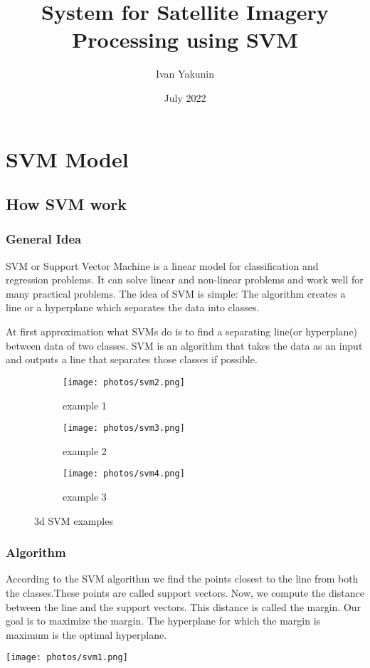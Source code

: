 \documentclass[10pt,a4paper]{report}
\title{System for Satellite Imagery Processing using SVM}
\author{Ivan Yakunin}
\date{July 2022}
\begin{document}
\maketitle
\tableofcontents
\part{SVM Model}
\chapter{How SVM work}
\section{General Idea}
SVM or Support Vector Machine is a linear model for classification and regression problems. It can solve linear and non-linear problems and work well for many practical problems. The idea of SVM is simple: The algorithm creates a line or a hyperplane which separates the data into classes.

At first approximation what SVMs do is to find a separating line(or hyperplane) between data of two classes. SVM is an algorithm that takes the data as an input and outputs a line that separates those classes if possible.

\begin{figure}
    \centering
    \begin{subfigure}{0.3\textwidth}
    \texttt{[image: photos/svm2.png]}
    \caption{example 1}
    \label{fig:sub1}
    \end{subfigure}
    \begin{subfigure}{0.3\textwidth}
    \texttt{[image: photos/svm3.png]}
    \caption{example 2}
    \label{fig:sub2}
    \end{subfigure}
    \begin{subfigure}{0.3\textwidth}
    \texttt{[image: photos/svm4.png]}
    \caption{example 3}
    \label{fig:sub3}
    \end{subfigure}
    \caption{3d SVM examples}
\end{figure}
\clearpage

\section{Algorithm}
According to the SVM algorithm we find the points closest to the line from both the classes.These points are called support vectors. Now, we compute the distance between the line and the support vectors. This distance is called the margin. Our goal is to maximize the margin. The hyperplane for which the margin is maximum is the optimal hyperplane.\cite{cherkassky2004practical}
\begin{center}
\end{center}
\texttt{[image: photos/svm1.png]}
\clearpage
\end{document}
